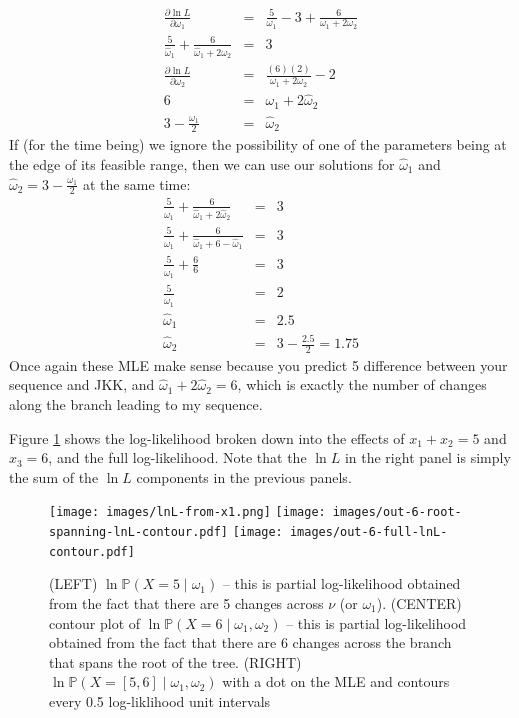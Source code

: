 \documentclass[11pt]{article}
\renewcommand{\Pr}{\mathbb{P}}
\begin{document}
\begin{eqnarray}
\frac{\partial\ln L}{\partial \omega_1} & = &
    \frac{5}{\omega_1} -3  + \frac{6}{\omega_1+2\omega_2} \\
\frac{5}{\hat{\omega}_1}  + \frac{6}{\hat{\omega}_1+2\omega_2} & = & 3 \\
\frac{\partial\ln L}{\partial \omega_2} & = &
    \frac{(6)(2)}{\omega_1+2\omega_2} - 2 \\
    6 & = & \omega_1+2\hat{\omega}_2 \\
    3 - \frac{\omega_1}{2} & = & \hat{\omega}_2 
\end{eqnarray}
If (for the time being) we ignore the possibility 
of one of the parameters being at the edge of its feasible range, then
    we can use our solutions for $\hat{\omega}_1$ and
    $\hat{\omega}_2 = 3 - \frac{\omega_1}{2}$ at the same time:
\begin{eqnarray}
\frac{5}{\hat{\omega}_1}  + \frac{6}{\hat{\omega}_1+2\hat{\omega}_2} & = & 3 \\
\frac{5}{\hat{\omega}_1}  + \frac{6}{\hat{\omega}_1+6 - \hat{\omega}_1} & = & 3 \\
\frac{5}{\hat{\omega}_1}  + \frac{6}{6} & = & 3 \\
\frac{5}{\hat{\omega}_1}  & = & 2 \\
\hat{\omega}_1 & = & 2.5 \\
\hat{\omega}_2 & = & 3 - \frac{2.5}{2} = 1.75 
\end{eqnarray}
Once again these MLE make sense because you predict 5 difference between your sequence and JKK, and
 $\hat{\omega}_1 + 2\hat{\omega}_2 = 6$, which is exactly the number of changes along the branch
leading to my sequence.

Figure \ref{fullLnLOut6} shows the
log-likelihood broken down into the effects of $x_1+x_2=5$ and $x_3=6$,
 and the full log-likelihood.
Note that the $\ln L$ in the right panel is simply the sum of 
    the $\ln L$ components in the previous panels.

\begin{figure}[h]
\hskip-0cm \texttt{[image: images/lnL-from-x1.png]}
\hskip-1cm \texttt{[image: images/out-6-root-spanning-lnL-contour.pdf]}
\hskip-1cm \texttt{[image: images/out-6-full-lnL-contour.pdf]}
\caption{(LEFT) $\ln\Pr(X=5\mid\omega_1)$ -- this is partial log-likelihood obtained from the fact that there are 5 changes across $\nu$ (or $\omega_1$).
(CENTER) contour plot of $\ln\Pr(X=6\mid\omega_1, \omega_2)$ -- this is partial log-likelihood obtained from the fact that there are 6 changes across the branch that spans the root of the tree.
(RIGHT) $\ln\Pr(X=[5,6]\mid\omega_1, \omega_2)$ with a dot on the MLE and contours every 0.5 log-liklihood unit intervals}\label{fullLnLOut6}
\end{figure}
\end{document}
